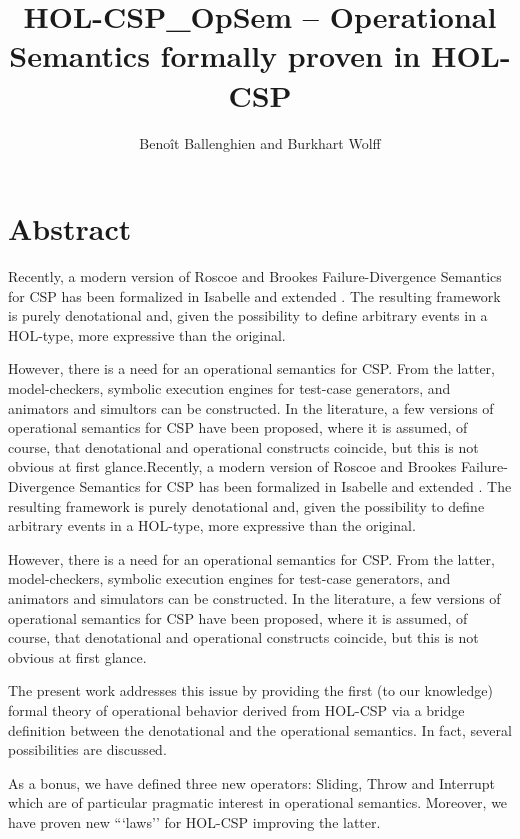 \documentclass[11pt,a4paper]{book}
\begin{document}
\title{HOL-CSP\_OpSem -- Operational Semantics formally proven in HOL-CSP}
\author{Benoît Ballenghien and Burkhart Wolff}
\maketitle
\chapter*{Abstract}

   Recently, a modern version of Roscoe and Brookes \cite{brookes-roscoe85} 
   Failure-Divergence Semantics for CSP has been formalized in Isabelle \cite{HOL-CSP-AFP}
   and extended \cite{HOL-CSPM-AFP}. The resulting framework is purely denotational
   and, given the possibility to define arbitrary events in a HOL-type, more expressive 
   than the original.

   However, there is a need for an operational semantics for CSP. From the latter, model-checkers,
   symbolic execution engines for test-case generators, and animators and simultors can be 
   constructed. In the literature, a few versions of operational semantics
   for CSP have been proposed, where it is assumed, of course, that denotational and operational 
   constructs coincide, but this is not obvious at first glance.Recently, a modern version of Roscoe and Brookes \cite{brookes-roscoe85} 
   Failure-Divergence Semantics for CSP has been formalized in Isabelle \cite{HOL-CSP-AFP}
   and extended \cite{HOL-CSPM-AFP}. The resulting framework is purely denotational
   and, given the possibility to define arbitrary events in a HOL-type, more expressive 
   than the original.

   However, there is a need for an operational semantics for CSP. From the latter, model-checkers,
   symbolic execution engines for test-case generators, and animators and simulators can be 
   constructed. In the literature, a few versions of operational semantics
   for CSP have been proposed, where it is assumed, of course, that denotational and operational 
   constructs coincide, but this is not obvious at first glance.
   
   The present work addresses this issue by providing the first (to our knowledge) formal theory 
   of operational behavior derived from HOL-CSP via a bridge definition between the 
   denotational and the operational semantics. In fact, several possibilities are discussed.
   
   As a bonus, we have defined three new operators: Sliding, Throw and Interrupt which are
   of particular pragmatic interest in operational semantics. Moreover, we have
   proven new ```laws'' for HOL-CSP improving the latter.
   
\end{document}
